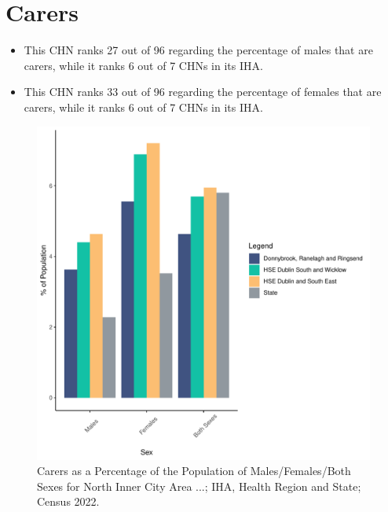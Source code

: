 \documentclass{article}
\begin{document}
\section{Carers}\label{sect:Carers}
\begin{itemize}
\item This CHN ranks  27 out of 96 regarding the percentage of males that are carers, while it ranks   6 out of 7 CHNs in its IHA.
\item This CHN ranks  33 out of 96 regarding the percentage of females that are carers, while it ranks   6 out of 7 CHNs in its IHA.
\end{itemize}
\begin{figure}[H]
	\centering
	\includegraphics[width = 150mm]{../figures/CareED.pdf}
	\caption{Carers as a Percentage of the Population of Males/Females/Both Sexes for North Inner City Area ...; IHA, Health Region and State; Census 2022.}
	\label{fig:2ae19629-1a6a-13a3-e055-000000000001}
	\end{figure}
\end{document}
